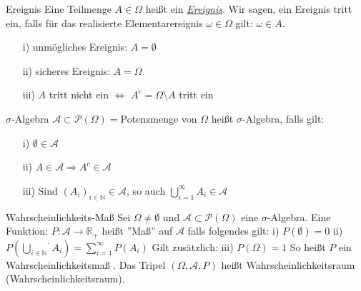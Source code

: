 \documentclass[avery5371,grid,frame]{flashcards} %
\newcommand{\1}{ \mathbb{1} } %
\begin{document}



\begin{flashcard}[Definition]{Ereignis}
  Eine Teilmenge $A \in \Omega$ heißt ein \underline{\textit{Ereignis}}. 
  Wir sagen, ein Ereignis tritt ein, falls für das realisierte Elementarereignis $\omega \in \Omega$ gilt: $\omega \in A$.
  \begin{itemize}
  \item[i)] unmögliches Ereignis: $A=\emptyset$
  \item[ii)] sicheres Ereignis: $A=\Omega$
  \item[iii)] $A$ tritt nicht ein $\Leftrightarrow$ $A^c=\Omega\setminus A$ tritt ein 
  \end{itemize}
\end{flashcard}

\begin{flashcard}[Definition]{ $\sigma$-Algebra}
  $\mathcal{A}\subset \mathcal{P}(\Omega)=$Potenzmenge von  $\Omega$ heißt $\sigma$-Algebra, falls gilt: 
  \begin{itemize}
  \item[i)] $\emptyset \in \mathcal{A}$
  \item[ii)] $A\in \mathcal{A} \Rightarrow A^c
    \in \mathcal{A}$
  \item[iii)] Sind $(A_i)_{i \in \mathbb{N}} \in \mathcal{A}$,
    so auch $\bigcup\limits_{i=1}^\infty A_i \in \mathcal{A}$
  \end{itemize}
\end{flashcard}

\begin{flashcard}[Definition]{Wahrscheinlichkeits-Maß}
  Sei $\Omega \neq \emptyset$ und $\mathcal{A}\subset
  \mathcal{P}(\Omega)$ eine $\sigma$-Algebra. Eine
  Funktion: $P: \mathcal{A} \rightarrow \mathbb{R}_+$
  heißt ''Maß'' auf $\mathcal{A}$ falls folgendes gilt:
  i) $P(\emptyset)=0$ 
  ii) $P\left(\stackrel{\cdot}{\bigcup\limits_{i \in
        \mathbb{N}}}A_i\right)=\sum\limits_{i=1}^\infty P(A_i)$ 
    Gilt zusätzlich:
  iii) $P(\Omega)=1$ 
  So heißt $P$ ein Wahrscheinlichkeitsmaß .
  Das Tripel $(\Omega,\mathcal{A},P)$ heißt Wahrscheinlichkeitsraum (Wahrscheinlichkeitsraum). 
\end{flashcard}
\end{document}
